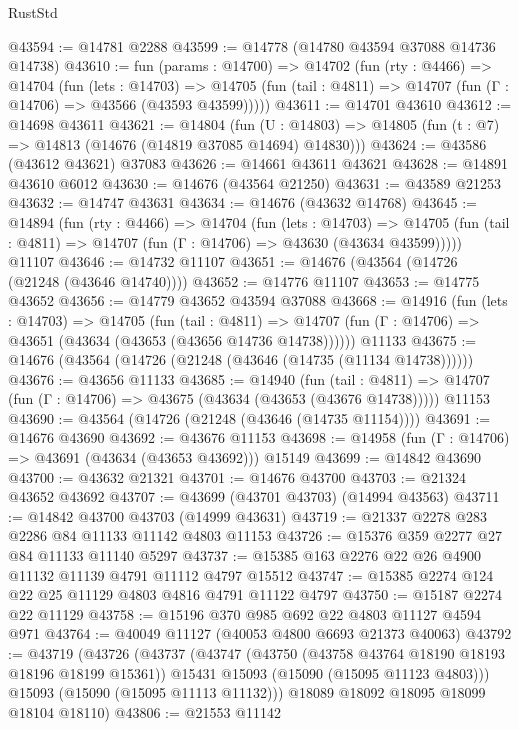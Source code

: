 \begin{lexlean}{RustStd}
\begin{coremodule}
@43594 := @14781 @2288
@43599 := @14778 (@14780 @43594 @37088 @14736 @14738)
@43610 := fun (params : @14700) =>
  @14702
    (fun (rty : @4466) =>
    @14704
      (fun (lets : @14703) =>
      @14705 (fun (tail : @4811) => @14707 (fun (Γ : @14706) => @43566 (@43593 @43599)))))
@43611 := @14701 @43610
@43612 := @14698 @43611
@43621 := @14804
    (fun (U : @14803) => @14805 (fun (t : @7) => @14813 (@14676 (@14819 @37085 @14694) @14830)))
@43624 := @43586 (@43612 @43621) @37083
@43626 := @14661 @43611 @43621
@43628 := @14891 @43610 @6012
@43630 := @14676 (@43564 @21250)
@43631 := @43589 @21253
@43632 := @14747 @43631
@43634 := @14676 (@43632 @14768)
@43645 := @14894
    (fun (rty : @4466) =>
    @14704
      (fun (lets : @14703) =>
      @14705 (fun (tail : @4811) => @14707 (fun (Γ : @14706) => @43630 (@43634 @43599)))))
    @11107
@43646 := @14732 @11107
@43651 := @14676 (@43564 (@14726 (@21248 (@43646 @14740))))
@43652 := @14776 @11107
@43653 := @14775 @43652
@43656 := @14779 @43652 @43594 @37088
@43668 := @14916
    (fun (lets : @14703) =>
    @14705
      (fun (tail : @4811) =>
      @14707 (fun (Γ : @14706) => @43651 (@43634 (@43653 (@43656 @14736 @14738))))))
    @11133
@43675 := @14676 (@43564 (@14726 (@21248 (@43646 (@14735 (@11134 @14738))))))
@43676 := @43656 @11133
@43685 := @14940
    (fun (tail : @4811) => @14707 (fun (Γ : @14706) => @43675 (@43634 (@43653 (@43676 @14738)))))
    @11153
@43690 := @43564 (@14726 (@21248 (@43646 (@14735 @11154))))
@43691 := @14676 @43690
@43692 := @43676 @11153
@43698 := @14958 (fun (Γ : @14706) => @43691 (@43634 (@43653 @43692))) @15149
@43699 := @14842 @43690
@43700 := @43632 @21321
@43701 := @14676 @43700
@43703 := @21324 @43652 @43692
@43707 := @43699 (@43701 @43703) (@14994 @43563)
@43711 := @14842 @43700 @43703 (@14999 @43631)
@43719 := @21337 @2278 @283 @2286 @84 @11133 @11142 @4803 @11153
@43726 := @15376 @359 @2277 @27 @84 @11133 @11140 @5297
@43737 := @15385 @163 @2276 @22 @26 @4900 @11132 @11139 @4791 @11112 @4797 @15512
@43747 := @15385 @2274 @124 @22 @25 @11129 @4803 @4816 @4791 @11122 @4797
@43750 := @15187 @2274 @22 @11129
@43758 := @15196 @370 @985 @692 @22 @4803 @11127 @4594 @971
@43764 := @40049 @11127 (@40053 @4800 @6693 @21373 @40063)
@43792 := @43719
    (@43726
      (@43737
        (@43747
          (@43750 (@43758 @43764 @18190 @18193 @18196 @18199 @15361))
          @15431
          @15093
          (@15090 (@15095 @11123 @4803)))
        @15093
        (@15090 (@15095 @11113 @11132)))
      @18089
      @18092
      @18095
      @18099
      @18104
      @18110)
@43806 := @21553
    @11142

\end{coremodule}
\end{lexlean}
